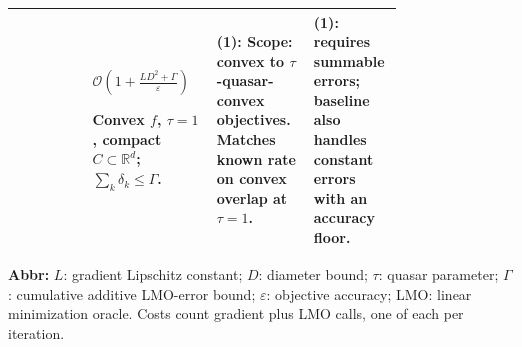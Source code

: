 \begin{table}[tp]
\begin{threeparttable}
\begin{tabularx}{\linewidth}{@{}>{\raggedright\arraybackslash}p{0.20\linewidth}>{\raggedright\arraybackslash}p{0.32\linewidth}>{\raggedright\arraybackslash}p{0.25\linewidth}>{\raggedright\arraybackslash}X@{}}
& $\mathcal{O}\!\left(1+\frac{LD^2+\Gamma}{\varepsilon}\right)$\par Convex $f$, $\tau=1$, compact $C\subset\mathbb{R}^d$; $\sum_k\delta_k\le\Gamma$.
& \textbf{(1)}: Scope: convex to $\tau$-quasar-convex objectives. Matches known rate on convex overlap at $\tau=1$.
& \textbf{(1)}: requires summable errors; baseline also handles constant errors with an accuracy floor. \\
\bottomrule
\end{tabularx}
\begin{tablenotes}[flushleft]\footnotesize
\item[] \textbf{Abbr:} $L$: gradient Lipschitz constant; $D$: diameter bound; $\tau$: quasar parameter; $\Gamma$: cumulative additive LMO-error bound; $\varepsilon$: objective accuracy; LMO: linear minimization oracle. Costs count gradient plus LMO calls, one of each per iteration.
\end{tablenotes}
\end{threeparttable}
\end{table}
\clearpage
